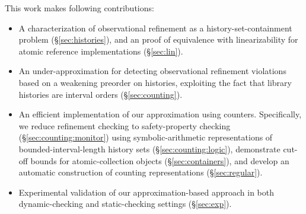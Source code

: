 This work makes following contributions:
\begin{itemize}

  \item A characterization of observational refinement as a
  history-set-containment problem (\S\ref{sec:histories}), and an proof of
  equivalence with linearizability for atomic reference implementations
  (\S\ref{sec:lin}).

  \item An under-approximation for detecting observational refinement
  violations based on a weakening preorder on histories, exploiting the fact
  that library histories are interval orders (\S\ref{sec:counting}).

  \item An efficient implementation of our approximation using counters.
  Specifically, we reduce refinement checking to safety-property checking
  (\S\ref{sec:counting:monitor}) using symbolic-arithmetic representations of
  bounded-interval-length history sets (\S\ref{sec:counting:logic}),
  demonstrate cut-off bounds for atomic-collection objects
  (\S\ref{sec:containers}), and develop an automatic construction of counting
  representations (\S\ref{sec:regular}).

  \item Experimental validation of our approximation-based approach in both
  dynamic-checking and static-checking settings (\S\ref{sec:exp}).

\end{itemize}
